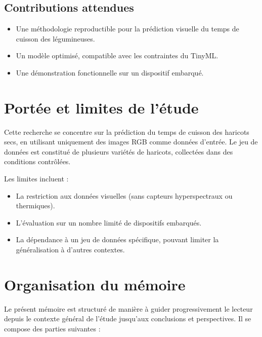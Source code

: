 \subsection{Contributions attendues}
\begin{itemize}
    \item Une méthodologie reproductible pour la prédiction visuelle du temps de cuisson des légumineuses.
    \item Un modèle optimisé, compatible avec les contraintes du TinyML.
    \item Une démonstration fonctionnelle sur un dispositif embarqué.
\end{itemize}

\section{Portée et limites de l’étude}
Cette recherche se concentre sur la prédiction du temps de cuisson des haricots secs, en utilisant uniquement des images RGB comme données d’entrée. Le jeu de données est constitué de plusieurs variétés de haricots, collectées dans des conditions contrôlées.

Les limites incluent :
\begin{itemize}
    \item La restriction aux données visuelles (sans capteurs hyperspectraux ou thermiques).
    \item L’évaluation sur un nombre limité de dispositifs embarqués.
    \item La dépendance à un jeu de données spécifique, pouvant limiter la généralisation à d’autres contextes.
\end{itemize}

\section{Organisation du mémoire}
Le présent mémoire est structuré de manière à guider progressivement le lecteur depuis le contexte général de l’étude jusqu’aux conclusions et perspectives. Il se compose des parties suivantes :  

